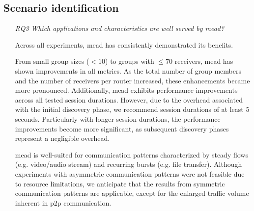 
\subsection{Scenario identification} %
\label{sub:discussion_scenario}
\begin{itemize}
\item[\textit{RQ3}]
    \textit{Which applications and characteristics are well served by \gls{mead}?}

    Across all experiments, \gls{mead} has consistently demonstrated its
        benefits.

    From small group sizes ($<10$) to groups with $\leq 70$ receivers, \gls{mead}
        has shown improvements in all metrics.
    As the total number of group members and the number of receivers per
        router increased, these enhancements became more pronounced.
    Additionally, \gls{mead} exhibits performance improvements across all tested
        session durations.
    However, due to the overhead associated with the initial discovery phase,
        we recommend session durations of at least 5 seconds.
    Particularly with longer session durations, the performance improvements
        become more significant, as subsequent discovery phases represent a
        negligible overhead.

    \gls{mead} is well-suited for communication patterns characterized by steady
        flows (e.g. video/audio stream) and recurring bursts (e.g. file
        transfer).
    Although experiments with asymmetric communication patterns were not
        feasible due to resource limitations, we anticipate that the results
        from symmetric communication patterns are applicable, except for the
        enlarged traffic volume inherent in \gls{p2p} communication.


\end{itemize}
